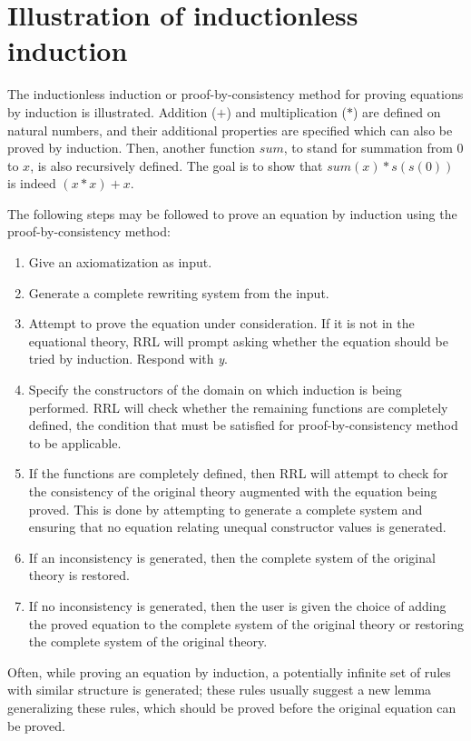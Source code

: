 \chapter {Illustration of inductionless induction} 
\normalsize 
\rm 
The inductionless induction or proof-by-consistency method for proving
equations by induction is illustrated. Addition ($+$) and
multiplication ($*$) are defined on natural numbers, and their
additional properties are specified which can also be proved by
induction. Then, another function $sum$, to stand for
summation from $0$ to $x$, is also recursively defined.  The goal is
to show that $sum(x) * s(s(0))$ is indeed $(x * x) + x$. 

The following steps may be followed to prove an equation by induction
using the proof-by-consistency method:
\begin{enumerate}
\item Give an axiomatization as input.
\item Generate a complete rewriting system from the input.
\item Attempt to prove the equation under consideration. If
it is not in the equational theory, RRL will prompt asking whether
the equation should be tried by induction. Respond with {\em y}.
\item Specify the constructors of the domain on which induction is being
performed. RRL will check whether the remaining functions are completely
defined, the condition that must be satisfied for proof-by-consistency
method to be applicable.
\item If the functions are completely defined, then RRL will attempt
to check for the consistency of the original theory augmented
with the equation being proved. This is done by attempting to generate a
complete system and ensuring that no equation relating unequal constructor
values is generated.
\item If an inconsistency is generated, then the complete
system of the original theory is restored.
\item If no inconsistency is generated, then
the user is given the choice of adding the proved equation to the
complete system of the original theory or restoring the complete
system of the original theory.
\end{enumerate}
Often, while proving an equation by induction, a potentially
infinite set of rules with similar structure is generated; these rules
usually suggest a new lemma generalizing these rules, which should
be proved before the original equation can be proved.

